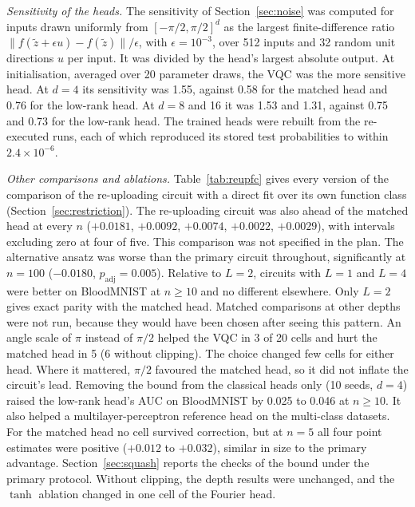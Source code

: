 \documentclass{ieeeaccess}
\newcommand{\vqc}{VQC}
\begin{document}
\emph{Sensitivity of the heads.} The sensitivity of Section~\ref{sec:noise} was computed for inputs drawn uniformly from $[-\pi/2,\pi/2]^d$ as the largest finite-difference ratio $\|f(\tilde z+\epsilon u)-f(\tilde z)\|/\epsilon$, with $\epsilon=10^{-3}$, over 512 inputs and 32 random unit directions $u$ per input. It was divided by the head's largest absolute output. At initialisation, averaged over 20 parameter draws, the \vqc{} was the more sensitive head. At $d=4$ its sensitivity was 1.55, against 0.58 for the matched head and 0.76 for the low-rank head. At $d=8$ and 16 it was 1.53 and 1.31, against 0.75 and 0.73 for the low-rank head. The trained heads were rebuilt from the re-executed runs, each of which reproduced its stored test probabilities to within $2.4\times10^{-6}$.

\emph{Other comparisons and ablations.} Table~\ref{tab:reupfc} gives every version of the comparison of the re-uploading circuit with a direct fit over its own function class (Section~\ref{sec:restriction}). The re-uploading circuit was also ahead of the matched head at every $n$ ($+0.0181$, $+0.0092$, $+0.0074$, $+0.0022$, $+0.0029$), with intervals excluding zero at four of five. This comparison was not specified in the plan. The alternative ansatz was worse than the primary circuit throughout, significantly at $n=100$ ($-0.0180$, $p_{\mathrm{adj}}=0.005$). Relative to $L=2$, circuits with $L=1$ and $L=4$ were better on BloodMNIST at $n\ge10$ and no different elsewhere. Only $L=2$ gives exact parity with the matched head. Matched comparisons at other depths were not run, because they would have been chosen after seeing this pattern. An angle scale of $\pi$ instead of $\pi/2$ helped the \vqc{} in 3 of 20 cells and hurt the matched head in 5 (6 without clipping). The choice changed few cells for either head. Where it mattered, $\pi/2$ favoured the matched head, so it did not inflate the circuit's lead. Removing the bound from the classical heads only (10 seeds, $d=4$) raised the low-rank head's AUC on BloodMNIST by 0.025 to 0.046 at $n\ge10$. It also helped a multilayer-perceptron reference head on the multi-class datasets. For the matched head no cell survived correction, but at $n=5$ all four point estimates were positive ($+0.012$ to $+0.032$), similar in size to the primary advantage. Section~\ref{sec:squash} reports the checks of the bound under the primary protocol. Without clipping, the depth results were unchanged, and the $\tanh$ ablation changed in one cell of the Fourier head.
\end{document}
